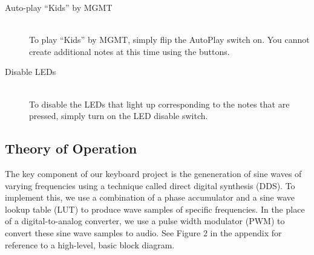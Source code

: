 \documentclass{article}
\begin{document}
\begin{description}
      \item[Auto-play ``Kids'' by MGMT] \hfill \\
        To play ``Kids'' by MGMT, simply flip the AutoPlay switch on. You cannot create additional notes at this time using the buttons.

      \item[Disable LEDs] \hfill \\
        To disable the LEDs that light up corresponding to the notes that are pressed, simply turn on the LED disable switch.
        
    \end{description}

  \subsection{Theory of Operation}
  

    The key component of our keyboard project is the geneneration of sine waves of varying frequencies using a technique called direct digital synthesis (DDS). To implement this, we use a combination of a phase accumulator and a sine wave lookup table (LUT) to produce wave samples of specific frequencies. In the place of a digital-to-analog converter, we use a pulse width modulator (PWM) to convert these sine wave samples to audio. See Figure 2 in the appendix for reference to a high-level, basic block diagram. 
    
\end{document}
